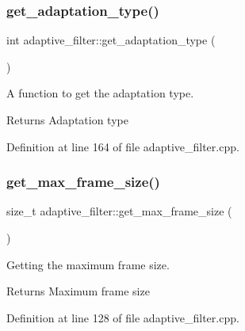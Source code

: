 \subsubsection{\texorpdfstring{get\+\_\+adaptation\+\_\+type()}{get\_adaptation\_type()}}
{\footnotesize\ttfamily int adaptive\+\_\+filter\+::get\+\_\+adaptation\+\_\+type (\begin{DoxyParamCaption}{ }\end{DoxyParamCaption})\hspace{0.3cm}{\ttfamily [protected]}}



A function to get the adaptation type. 

\begin{DoxyReturn}{Returns}
Adaptation type 
\end{DoxyReturn}


Definition at line 164 of file adaptive\+\_\+filter.\+cpp.

\mbox{\label{classadaptive__filter_a281ea01967a1e95ee3182d7be68118d7}} 
\subsubsection{\texorpdfstring{get\+\_\+max\+\_\+frame\+\_\+size()}{get\_max\_frame\_size()}}
{\footnotesize\ttfamily size\+\_\+t adaptive\+\_\+filter\+::get\+\_\+max\+\_\+frame\+\_\+size (\begin{DoxyParamCaption}{ }\end{DoxyParamCaption})}



Getting the maximum frame size. 

\begin{DoxyReturn}{Returns}
Maximum frame size 
\end{DoxyReturn}


Definition at line 128 of file adaptive\+\_\+filter.\+cpp.

\mbox{\label{classadaptive__filter_a2606c675bbd630cad6db55d77ccaa759}} 
